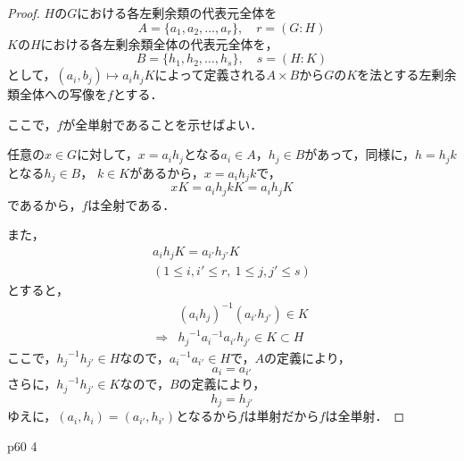 \documentclass[dvipdfmx,uplatex,11pt]{jsarticle}
\theoremstyle{mytheorem}
\begin{document}
    \begin{leftbar}
        \begin{proof}
            $H$の$G$における各左剰余類の代表元全体を
            \[
                A =\{ a_1, a_2 ,\dots,a_r\} ,\quad r=(G:H)
            \]
            $K$の$H$における各左剰余類全体の代表元全体を，
            \[
                B = \{ h_1 ,h_2,\dots,h_s\} , \quad s=(H:K)
            \]
            として，$(a_i , b_j) \longmapsto a_i h_j K$によって定義される$A \times B$から$G$の$K$を法とする左剰余類全体への写像を$f$とする．

            ここで，$f$が全単射であることを示せばよい．

            任意の$x \in G$に対して，$x = a_i h_j$となる$a_i \in A$，$h_j \in B$があって，同様に，$h= h_j k$となる$h_j \in B$，
            $k \in K$があるから，$x= a_i h_j k $で，
            \[
                xK = a_i h_j k K = a_i h_j K
            \]
            であるから，$f$は全射である．

            また，
            \begin{gather*}
                a_i h_j K =a_{i'} h_{j'} K \\
                (1 \le i,i' \le r,~ 1\le j,j' \le s)
            \end{gather*}
            とすると，
            \begin{align*}
                & (a_i h_j)^{-1} (a_{i'} h_{j'}) \in K \\
                \Longrightarrow & {h_j}^{-1} {a_i}^{-1} a_{i'} h_{j'} \in K \subset H
            \end{align*}
            ここで，${h_j}^{-1} h_{j'} \in H$なので，${a_i}^{-1} a_{i'} \in H$で，$A$の定義により，
            \[
                a_i = a_{i'}
            \]
            さらに，${h_j}^{-1} h_{j'} \in K$なので，$B$の定義により，
            \[
                h_j = h_{j'}
            \]
            ゆえに，$(a_i,h_i)=(a_{i'},h_{i'})$となるから$f$は単射だから$f$は全単射．
        \end{proof}
        \end{leftbar}
        \newpage 
        p60 4
\end{document}
